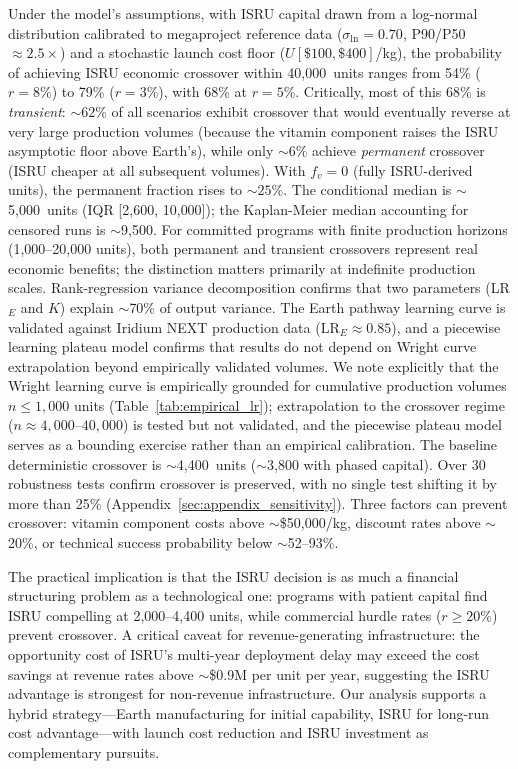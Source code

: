 \documentclass[preprint,12pt]{elsarticle}
\begin{document}
Under the model's assumptions, with ISRU capital drawn from a log-normal distribution calibrated to megaproject reference data \cite{flyvbjerg2014} ($\sigma_{\ln} = 0.70$, P90/P50 $\approx 2.5\times$) and a stochastic launch cost floor ($U[\$100, \$400]$/kg), the probability of achieving ISRU economic crossover within 40{,}000~units ranges from 54\% ($r = 8\%$) to 79\% ($r = 3\%$), with 68\% at $r = 5\%$. Critically, most of this 68\% is \emph{transient}: ${\sim}62\%$ of all scenarios exhibit crossover that would eventually reverse at very large production volumes (because the vitamin component raises the ISRU asymptotic floor above Earth's), while only ${\sim}6\%$ achieve \emph{permanent} crossover (ISRU cheaper at all subsequent volumes). With $f_v = 0$ (fully ISRU-derived units), the permanent fraction rises to ${\sim}25\%$. The conditional median is $\sim$5{,}000~units (IQR [2{,}600, 10{,}000]); the Kaplan-Meier median accounting for censored runs is $\sim$9{,}500. For committed programs with finite production horizons (1{,}000--20{,}000 units), both permanent and transient crossovers represent real economic benefits; the distinction matters primarily at indefinite production scales. Rank-regression variance decomposition confirms that two parameters (LR$_E$ and $K$) explain $\sim$70\% of output variance. The Earth pathway learning curve is validated against Iridium NEXT production data ($\mathrm{LR}_E \approx 0.85$), and a piecewise learning plateau model confirms that results do not depend on Wright curve extrapolation beyond empirically validated volumes. We note explicitly that the Wright learning curve is empirically grounded for cumulative production volumes $n \leq 1{,}000$ units (Table~\ref{tab:empirical_lr}); extrapolation to the crossover regime ($n \approx 4{,}000$--$40{,}000$) is tested but not validated, and the piecewise plateau model serves as a bounding exercise rather than an empirical calibration. The baseline deterministic crossover is $\sim$4{,}400~units ($\sim$3{,}800 with phased capital). Over 30 robustness tests confirm crossover is preserved, with no single test shifting it by more than 25\% (Appendix~\ref{sec:appendix_sensitivity}). Three factors can prevent crossover: vitamin component costs above $\sim$\$50{,}000/kg, discount rates above $\sim$20\%, or technical success probability below $\sim$52--93\%.

The practical implication is that the ISRU decision is as much a financial structuring problem as a technological one: programs with patient capital find ISRU compelling at 2{,}000--4{,}400 units, while commercial hurdle rates ($r \geq 20\%$) prevent crossover. A critical caveat for revenue-generating infrastructure: the opportunity cost of ISRU's multi-year deployment delay may exceed the cost savings at revenue rates above $\sim$\$0.9M per unit per year, suggesting the ISRU advantage is strongest for non-revenue infrastructure. Our analysis supports a hybrid strategy---Earth manufacturing for initial capability, ISRU for long-run cost advantage---with launch cost reduction and ISRU investment as complementary pursuits.
\end{document}

